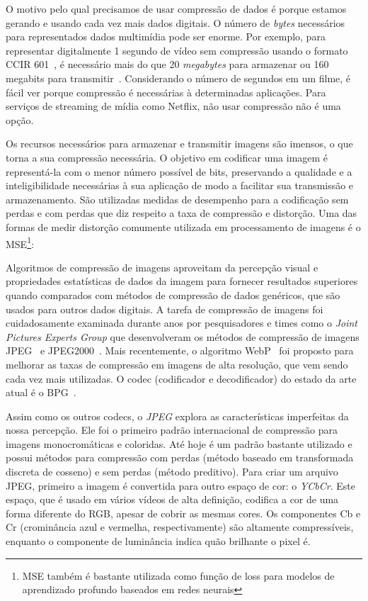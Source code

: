 O motivo pelo qual precisamos de usar compressão de dados é porque estamos gerando e usando cada vez mais dados digitais. O número de \textit{bytes} necessários para representados dados multimídia pode ser enorme. Por exemplo, para representar digitalmente 1 segundo de vídeo sem compressão usando o formato CCIR 601~\cite{sayood2017introduction}, é necessário mais do que 20 \textit{megabytes} para armazenar ou 160 megabits para transmitir~\cite{sayood2017introduction}. Considerando o número de segundos em um filme, é fácil ver porque compressão é necessárias à determinadas aplicações. Para serviços de streaming de mídia como Netflix, não usar compressão não é uma opção.

Os recursos necessários para armazenar e transmitir imagens são imensos, o que torna a sua compressão necessária. O objetivo em codificar uma imagem é representá-la com o menor número possível de bits, preservando a qualidade e a inteligibilidade necessárias à sua aplicação de modo a facilitar sua transmissão e armazenamento. São utilizadas medidas de desempenho para a codificação sem perdas e com perdas que diz respeito a taxa de compressão e distorção. Uma das formas de medir distorção comumente utilizada em processamento de imagens é o \acrshort{MSE}\footnote{MSE também é bastante utilizada como função de loss para modelos de aprendizado profundo baseados em redes neurais}: 

Algoritmos de compressão de imagens aproveitam da percepção visual e propriedades estatísticas de dados da imagem para fornecer resultados superiores quando comparados com métodos de compressão de dados genéricos, que são usados para outros dados digitais. A tarefa de compressão de imagens foi cuidadosamente examinada durante anos por pesquisadores e times como o \textit{Joint Pictures Experts Group} que desenvolveram os métodos de compressão de imagens JPEG~\cite{jpeg1993} e JPEG2000~\cite{jpeg2000}. Mais recentemente, o algoritmo WebP~\cite{webp} foi proposto para melhorar as taxas de compressão em imagens de alta resolução, que vem sendo cada vez mais utilizadas. O codec (codificador e decodificador) do estado da arte atual é o BPG~\cite{bpg}.

Assim como os outros codecs, o \textit{JPEG} explora as características imperfeitas da nossa percepção. Ele foi o primeiro padrão internacional de compressão para imagens monocromáticas e coloridas. Até hoje é um padrão bastante utilizado e possui métodos para compressão com perdas (método baseado em transformada discreta de cosseno) e sem perdas (método preditivo). Para criar um arquivo JPEG, primeiro a imagem é convertida para outro espaço de cor: o \textit{YCbCr}. Este espaço, que é usado em vários vídeos de alta definição, codifica a cor de uma forma diferente do RGB, apesar de cobrir as mesmas cores. Os componentes Cb e Cr (crominância azul e vermelha, respectivamente) são altamente compressíveis, enquanto o componente de luminância indica quão brilhante o pixel é. 

